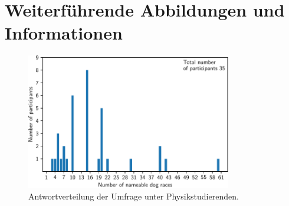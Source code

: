 \section{Weiterführende Abbildungen und Informationen}
\begin{figure}
\centering
\includegraphics[width=0.8\textwidth]{./survey/answers_plot.pdf}
\caption{Antwortverteilung der Umfrage unter Physikstudierenden.}
\label{fig:Antwortverteilung}
\end{figure}

